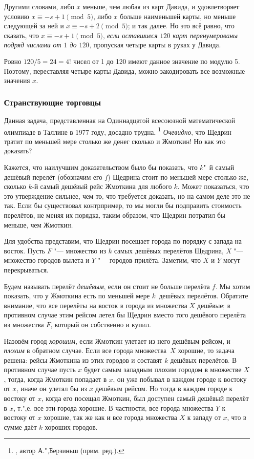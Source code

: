 \documentclass[twoside]{book}
\begin{document}
Другими словами, либо $x$ меньше, чем любая из карт Давида, и
удовлетворяет условию $x\equiv-s + 1 \pmod 5$, либо $x$ больше наименьшей
карты, но меньше следующей за ней и $x\equiv -s + 2 \pmod 5$; и так
далее.  Но это всё равно, что сказать, что $x\equiv -s + 1 \pmod 5$,
\emph{если оставшиеся $120$ карт перенумерованы подряд числами от $1$ до $120$}, пропуская четыре карты в руках
у Давида.

Ровно $120/5 = 24 = 4!$ чисел от 1 до 120 имеют данное значение по модулю 5.
Поэтому, переставляя четыре карты Давида, можно закодировать все возможные значения $x$.
\heart

\subsubsection*{Странствующие торговцы} %

Данная задача, представленная на Одиннадцатой всесоюзной математической олимпиаде в Таллине в 1977 году, досадно трудна.%
\footnote{\cite[№240]{ВсМО}, автор  А.",Берзиньш (прим. ред.).}
\emph{Очевидно}, что Щедрин тратит по меньшей мере столько же денег сколько и Жмоткин!
Но как это доказать? %

\medskip

Кажется, что наилучшим доказательством было бы показать, что $k$"~й самый
дешёвый перелёт (обозначим его $f$) Щедрина стоит по меньшей мере столько же, сколько $k$-й самый дешёвый рейс Жмоткина для любого $k$.
Может показаться, что это утверждение сильнее, чем то, что требуется доказать, но на самом деле это не так.
Если бы существовал контрпример, то мы могли бы подправить стоимость перелётов, не меняя их порядка, таким образом, что Щедрин потратил бы меньше, чем Жмоткин.

Для удобства представим, что Щедрин посещает города по порядку с запада на восток.
Пусть $F$ "--- множество из $k$ самых дешёвых перелётов Щедрина, $X$ "--- множество городов вылета и $Y$ "--- городов прилёта.
Заметим, что $X$ и $Y$ могут перекрываться.

Будем называть перелёт \emph{дешёвым}, если он стоит не больше перелёта $f$.
Мы хотим показать, что у Жмоткина есть по меньшей мере $k$~дешёвых перелётов.
Обратите внимание, что все перелёты на восток в города из множества $X$ дешёвые; в противном случае этим рейсом летел бы Щедрин вместо того дешёвого перелёта из множества $F$, который он собственно и купил.

Назовём город \emph{хорошим}, если Жмоткин улетает из него дешёвым рейсом, и \emph{плохим} в обратном случае.
Если все города множества~$X$ хорошие, то задача решена: рейсы Жмоткина из этих городов и составят $k$ дешёвых перелётов.
В противном случае пусть $x$ будет самым западным плохим городом в множестве $X$, тогда, когда  Жмоткин попадает в $x$, он уже побывал в каждом городе к востоку от $x$, иначе он улетал бы из $x$ дешёвым рейсом.
Но тогда в каждом городе к востоку от $x$, когда его посещал Жмоткин, был доступен самый дешёвый перелёт в $x$, т.",е. все эти города хорошие.
В частности, все города множества $Y$ к востоку от $x$ хорошие, так же как и все города множества $X$ к западу от $x$, что в сумме даёт $k$ хороших городов.
\heart
\end{document}
